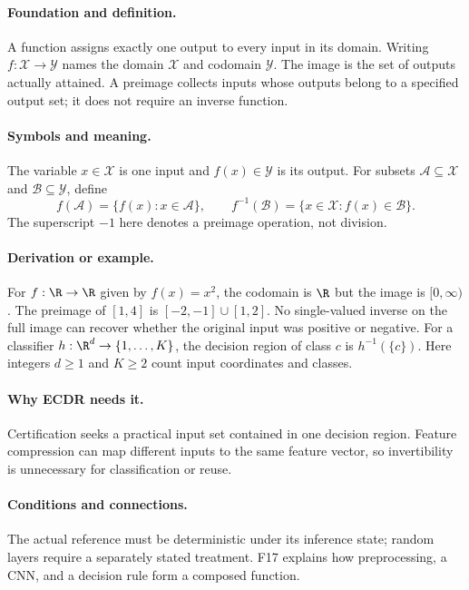 \paragraph{Foundation and definition.}
A function assigns exactly one output to every input in its domain.
Writing $f:\mathcal X\to\mathcal Y$ names the domain $\mathcal X$
and codomain $\mathcal Y$. The image is the set of outputs actually
attained. A preimage collects inputs whose outputs belong to a specified
output set; it does not require an inverse function.
\paragraph{Symbols and meaning.}
The variable $x\in\mathcal X$ is one input and $f(x)\in\mathcal Y$
is its output. For subsets $\mathcal A\subseteq\mathcal X$ and
$\mathcal B\subseteq\mathcal Y$, define
\[
 f(\mathcal A)=\{f(x):x\in\mathcal A\},\qquad
 f^{-1}(\mathcal B)=\{x\in\mathcal X:f(x)\in\mathcal B\}.
\]
The superscript $-1$ here denotes a preimage operation, not division.
\paragraph{Derivation or example.}
For $f:\R\to\R$ given by $f(x)=x^2$, the codomain is $\R$ but
the image is $[0,\infty)$. The preimage of $[1,4]$ is
$[-2,-1]\cup[1,2]$. No single-valued inverse on the full image can
recover whether the original input was positive or negative.
For a classifier $h:\R^{d}\to\{1,\ldots,K\}$, the decision region
of class $c$ is $h^{-1}(\{c\})$. Here integers $d\ge1$ and $K\ge2$
count input coordinates and classes.
\paragraph{Why ECDR needs it.}
Certification seeks a practical input set contained in one decision
region. Feature compression can map different inputs to the same feature
vector, so invertibility is unnecessary for classification or reuse.
\paragraph{Conditions and connections.}
The actual reference must be deterministic under its inference state;
random layers require a separately stated treatment. F17 explains how
preprocessing, a CNN, and a decision rule form a composed function.

